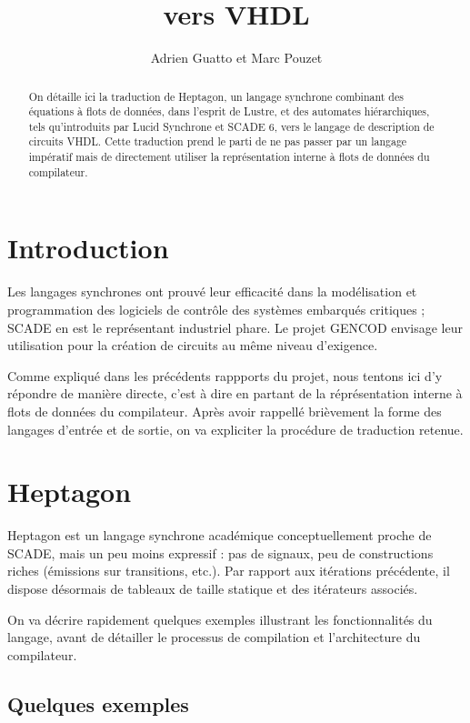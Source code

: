\documentclass[9pt,a4paper]{article}
\title{\LANG{} vers VHDL}
\author{Adrien Guatto et Marc Pouzet}
\newcommand{\LANG}{Heptagon}
\begin{document}
\maketitle

\begin{abstract}
  On détaille ici la traduction de \LANG{}, un langage synchrone combinant des
  équations à flots de données, dans l'esprit de Lustre, et des automates
  hiérarchiques, tels qu'introduits par Lucid Synchrone et SCADE 6, vers le
  langage de description de circuits VHDL. Cette traduction prend le parti de ne
  pas passer par un langage impératif mais de directement utiliser la
  représentation interne à flots de données du compilateur.
\end{abstract}

\tableofcontents

\section{Introduction}

Les langages synchrones \cite{twelveyears} ont prouvé leur efficacité dans la
modélisation et programmation des logiciels de contrôle des systèmes embarqués
critiques ; SCADE en est le représentant industriel phare. Le projet GENCOD
envisage leur utilisation pour la création de circuits au même niveau
d'exigence.

Comme expliqué dans les précédents rappports du projet, nous tentons ici d'y
répondre de manière directe, c'est à dire en partant de la réprésentation
interne à flots de données du compilateur. Après avoir rappellé brièvement la
forme des langages d'entrée et de sortie, on va expliciter la procédure de
traduction retenue.

\section{\LANG{}}

\LANG{} est un langage synchrone académique conceptuellement proche de SCADE,
mais un peu moins expressif : pas de signaux, peu de constructions riches
(émissions sur transitions, etc.). Par rapport aux itérations précédente, il
dispose désormais de tableaux de taille statique et des itérateurs associés.

On va décrire rapidement quelques exemples illustrant les fonctionnalités du
langage, avant de détailler le processus de compilation et l'architecture du
compilateur.

\subsection{Quelques exemples}
\end{document}

